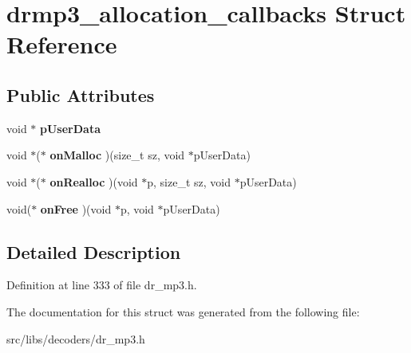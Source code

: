 \hypertarget{structdrmp3__allocation__callbacks}{\section{drmp3\-\_\-allocation\-\_\-callbacks Struct Reference}
\label{structdrmp3__allocation__callbacks}
}
\subsection*{Public Attributes}
\begin{DoxyCompactItemize}
\item 
\hypertarget{structdrmp3__allocation__callbacks_a6143e313c75cae01f6aa30544d476dc2}{void $\ast$ {\bfseries p\-User\-Data}}\label{structdrmp3__allocation__callbacks_a6143e313c75cae01f6aa30544d476dc2}

\item 
\hypertarget{structdrmp3__allocation__callbacks_a28a61b5e9f3efa3decdf15427e30ca21}{void $\ast$($\ast$ {\bfseries on\-Malloc} )(size\-\_\-t sz, void $\ast$p\-User\-Data)}\label{structdrmp3__allocation__callbacks_a28a61b5e9f3efa3decdf15427e30ca21}

\item 
\hypertarget{structdrmp3__allocation__callbacks_a9bc2f4003786159dcc1b28384b7afede}{void $\ast$($\ast$ {\bfseries on\-Realloc} )(void $\ast$p, size\-\_\-t sz, void $\ast$p\-User\-Data)}\label{structdrmp3__allocation__callbacks_a9bc2f4003786159dcc1b28384b7afede}

\item 
\hypertarget{structdrmp3__allocation__callbacks_ab350f3eaf8db82d8f5305ac76e65b26f}{void($\ast$ {\bfseries on\-Free} )(void $\ast$p, void $\ast$p\-User\-Data)}\label{structdrmp3__allocation__callbacks_ab350f3eaf8db82d8f5305ac76e65b26f}

\end{DoxyCompactItemize}


\subsection{Detailed Description}


Definition at line 333 of file dr\-\_\-mp3.\-h.



The documentation for this struct was generated from the following file\-:\begin{DoxyCompactItemize}
\item 
src/libs/decoders/dr\-\_\-mp3.\-h\end{DoxyCompactItemize}
